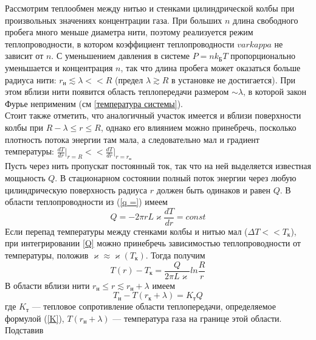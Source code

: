 \documentclass[12pt]{article}
\begin{document}
        Рассмотрим теплообмен между нитью и стенками цилиндрической колбы при произвольных значениях концентрации газа.
        При больших $n$ длина свободного пробега много меньше диаметра нити, поэтому реализуется режим теплопроводности, в
        котором коэффициент теплопроводности $varkappa$ не зависит от $n$. С уменьшением давления в
        системе $P = nk_{\text{Б}}T$ пропорционально уменьшается и концентрация $n$, так что длина пробега может оказаться больше
        радиуса нити: $r_{\text{н}} \lesssim \lambda << R$ (предел $\lambda \gtrsim R$ в установке не достигается). При этом вблизи нити появится
        область теплопередачи размером $\sim \lambda$, в которой закон Фурье неприменим (см \ref{температура системы}).\\
        Стоит также отметить, что аналогичный участок имеется и вблизи поверхности колбы при $R - \lambda \le r \le R$, однако
        его влиянием можно принебречь, посколько плотность потока энергии там мала, а следовательно мал и
        градиент температуры: $\frac{dT}{dr}\bigg|_{r=R} << \frac{dT}{dr}\bigg|_{r=r_{\text{н}}} $\\
        Пусть через нить пропускат постоянный ток, так что на ней выделяется известная мощьность $Q$. В стационарном состоянии полный поток энергии через
        любую цилиндрическую поверхность радиуса $r$ должен быть одинаков и равен $Q$. В области теплопроводности из (\ref{q =}) имеем
        \begin{equation}\label{Q}
            Q = -2\pi r L\varkappa \frac{dT}{dr} = const
        \end{equation}
        Если перепад температуры между стенками колбы и нитью мал ($\Delta T << T_{\text{к}}$), при интегрировании \ref{Q} можно принебречь зависимостью теплопроводности
        от температуры, положив $\varkappa \approx \varkappa(T_{\text{к}})$. Тогда получим
        \begin{equation}\label{T_r)}
            T(r) - T_{\text{к}} = \frac{Q}{2\pi L\varkappa}ln \frac{R}{r}
        \end{equation}
        В области вблизи нити $r_{\text{н}} \le r \lesssim r_{\text{н}} + \lambda$ имеем
        \begin{equation}\label{T_h}
            T_{\text{н}} - T(r_{\text{к}} + \lambda) = K_{\text{т}}Q
        \end{equation}
        где $K_{\text{т}}$ — тепловое сопротивление области теплопередачи, определяемое формулой (\ref{K}), $T(r_{\text{н}} + \lambda)$ — температура газа на границе этой области. Подставив
\end{document}
